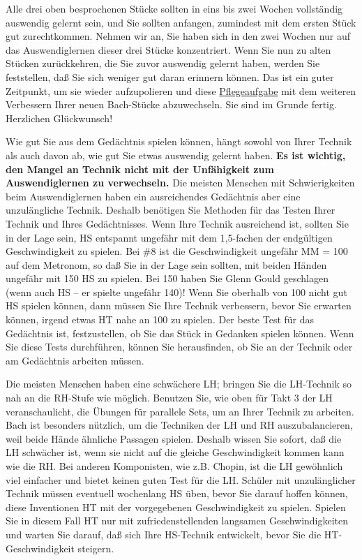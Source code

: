 Alle drei oben besprochenen Stücke sollten in eins bis zwei Wochen vollständig auswendig gelernt sein, und Sie sollten anfangen, zumindest mit dem ersten Stück gut zurechtkommen.
Nehmen wir an, Sie haben sich in den zwei Wochen nur auf das Auswendiglernen dieser drei Stücke konzentriert.
Wenn Sie nun zu alten Stücken zurückkehren, die Sie zuvor auswendig gelernt haben, werden Sie feststellen, daß Sie sich weniger gut daran erinnern können.
Das ist ein guter Zeitpunkt, um sie wieder aufzupolieren und diese \hyperref[c1iii6f]{Pflegeaufgabe} mit dem weiteren Verbessern Ihrer neuen Bach-Stücke abzuwechseln.
Sie sind im Grunde fertig.
Herzlichen Glückwunsch!

Wie gut Sie aus dem Gedächtnis spielen können, hängt sowohl von Ihrer Technik als auch davon ab, wie gut Sie etwas auswendig gelernt haben.
\textbf{Es ist wichtig, den Mangel an Technik nicht mit der Unfähigkeit zum Auswendiglernen zu verwechseln.}
Die meisten Menschen mit Schwierigkeiten beim Auswendiglernen haben ein ausreichendes Gedächtnis aber eine unzulängliche Technik.
Deshalb benötigen Sie Methoden für das Testen Ihrer Technik und Ihres Gedächtnisses.
Wenn Ihre Technik ausreichend ist, sollten Sie in der Lage sein, HS entspannt ungefähr mit dem 1,5-fachen der endgültigen Geschwindigkeit zu spielen.
Bei \#8 ist die Geschwindigkeit ungefähr MM = 100 auf dem Metronom, so daß Sie in der Lage sein sollten, mit beiden Händen ungefähr mit 150 HS zu spielen.
Bei 150 haben Sie Glenn Gould geschlagen (wenn auch HS -- er spielte ungefähr 140)!
Wenn Sie oberhalb von 100 nicht gut HS spielen können, dann müssen Sie Ihre Technik verbessern, bevor Sie erwarten können, irgend etwas HT nahe an 100 zu spielen.
Der beste Test für das Gedächtnis ist, festzustellen, ob Sie das Stück in Gedanken spielen können.
Wenn Sie diese Tests durchführen, können Sie herausfinden, ob Sie an der Technik oder am Gedächtnis arbeiten müssen.

Die meisten Menschen haben eine schwächere LH; bringen Sie die LH-Technik so nah an die RH-Stufe wie möglich.
Benutzen Sie, wie oben für Takt 3 der LH veranschaulicht, die Übungen für parallele Sets, um an Ihrer Technik zu arbeiten.
Bach ist besonders nützlich, um die Techniken der LH und RH auszubalancieren, weil beide Hände ähnliche Passagen spielen.
Deshalb wissen Sie sofort, daß die LH schwächer ist, wenn sie nicht auf die gleiche Geschwindigkeit kommen kann wie die RH.
Bei anderen Komponisten, wie z.B. Chopin, ist die LH gewöhnlich viel einfacher und bietet keinen guten Test für die LH.
Schüler mit unzulänglicher Technik müssen eventuell wochenlang HS üben, bevor Sie darauf hoffen können, diese Inventionen HT mit der vorgegebenen Geschwindigkeit zu spielen.
Spielen Sie in diesem Fall HT nur mit zufriedenstellenden langsamen Geschwindigkeiten und warten Sie darauf, daß sich Ihre HS-Technik entwickelt, bevor Sie die HT-Geschwindigkeit steigern.

